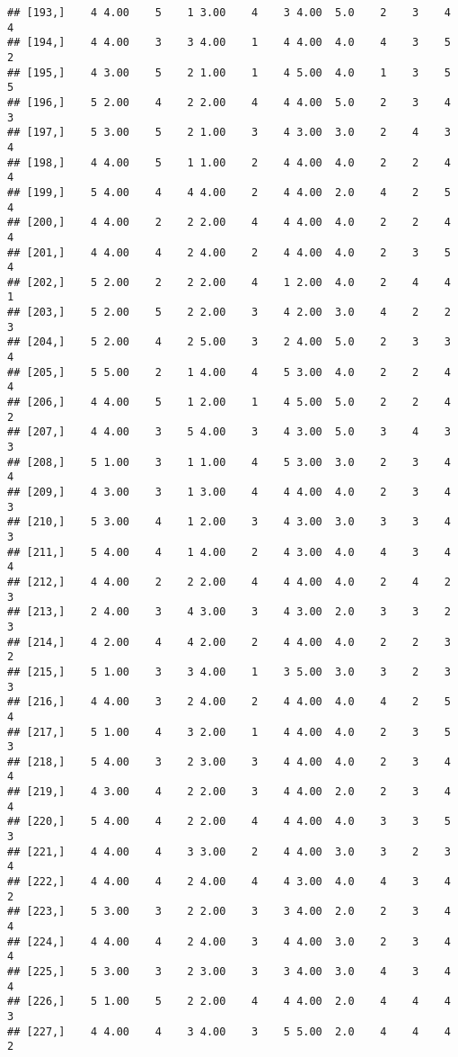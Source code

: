 \documentclass[]{article}
\begin{document}
\begin{verbatim}
## [193,]    4 4.00    5    1 3.00    4    3 4.00  5.0    2    3    4    4
## [194,]    4 4.00    3    3 4.00    1    4 4.00  4.0    4    3    5    2
## [195,]    4 3.00    5    2 1.00    1    4 5.00  4.0    1    3    5    5
## [196,]    5 2.00    4    2 2.00    4    4 4.00  5.0    2    3    4    3
## [197,]    5 3.00    5    2 1.00    3    4 3.00  3.0    2    4    3    4
## [198,]    4 4.00    5    1 1.00    2    4 4.00  4.0    2    2    4    4
## [199,]    5 4.00    4    4 4.00    2    4 4.00  2.0    4    2    5    4
## [200,]    4 4.00    2    2 2.00    4    4 4.00  4.0    2    2    4    4
## [201,]    4 4.00    4    2 4.00    2    4 4.00  4.0    2    3    5    4
## [202,]    5 2.00    2    2 2.00    4    1 2.00  4.0    2    4    4    1
## [203,]    5 2.00    5    2 2.00    3    4 2.00  3.0    4    2    2    3
## [204,]    5 2.00    4    2 5.00    3    2 4.00  5.0    2    3    3    4
## [205,]    5 5.00    2    1 4.00    4    5 3.00  4.0    2    2    4    4
## [206,]    4 4.00    5    1 2.00    1    4 5.00  5.0    2    2    4    2
## [207,]    4 4.00    3    5 4.00    3    4 3.00  5.0    3    4    3    3
## [208,]    5 1.00    3    1 1.00    4    5 3.00  3.0    2    3    4    4
## [209,]    4 3.00    3    1 3.00    4    4 4.00  4.0    2    3    4    3
## [210,]    5 3.00    4    1 2.00    3    4 3.00  3.0    3    3    4    3
## [211,]    5 4.00    4    1 4.00    2    4 3.00  4.0    4    3    4    4
## [212,]    4 4.00    2    2 2.00    4    4 4.00  4.0    2    4    2    3
## [213,]    2 4.00    3    4 3.00    3    4 3.00  2.0    3    3    2    3
## [214,]    4 2.00    4    4 2.00    2    4 4.00  4.0    2    2    3    2
## [215,]    5 1.00    3    3 4.00    1    3 5.00  3.0    3    2    3    3
## [216,]    4 4.00    3    2 4.00    2    4 4.00  4.0    4    2    5    4
## [217,]    5 1.00    4    3 2.00    1    4 4.00  4.0    2    3    5    3
## [218,]    5 4.00    3    2 3.00    3    4 4.00  4.0    2    3    4    4
## [219,]    4 3.00    4    2 2.00    3    4 4.00  2.0    2    3    4    4
## [220,]    5 4.00    4    2 2.00    4    4 4.00  4.0    3    3    5    3
## [221,]    4 4.00    4    3 3.00    2    4 4.00  3.0    3    2    3    4
## [222,]    4 4.00    4    2 4.00    4    4 3.00  4.0    4    3    4    2
## [223,]    5 3.00    3    2 2.00    3    3 4.00  2.0    2    3    4    4
## [224,]    4 4.00    4    2 4.00    3    4 4.00  3.0    2    3    4    4
## [225,]    5 3.00    3    2 3.00    3    3 4.00  3.0    4    3    4    4
## [226,]    5 1.00    5    2 2.00    4    4 4.00  2.0    4    4    4    3
## [227,]    4 4.00    4    3 4.00    3    5 5.00  2.0    4    4    4    2

\end{verbatim}
\end{document}
